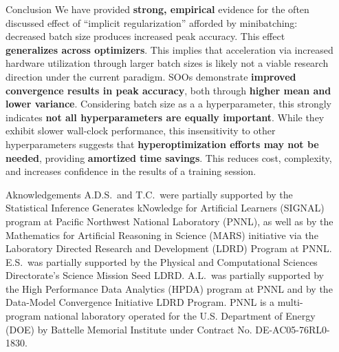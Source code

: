 \documentclass[final]{beamer}
\newlength{\sepwidth}
\newlength{\colwidth}
\newcommand{\separatorcolumn}{\begin{column}{\sepwidth}\end{column}}
\begin{document}
\begin{frame}[t]
\begin{columns}[t]
\begin{column}{\colwidth}
      \begin{block}{Conclusion}
        We have provided \textbf{strong, empirical} evidence for the often
        discussed effect of ``implicit regularization'' afforded by
        minibatching: decreased batch size produces increased peak accuracy.
        This effect \textbf{generalizes across optimizers}. This implies that
        acceleration via increased hardware utilization through larger batch
        sizes is likely not a viable research direction under the current
        paradigm. SOOs demonstrate \textbf{improved convergence results in peak
          accuracy}, both through \textbf{higher mean and lower variance}.
        Considering batch size as a a hyperparameter, this strongly indicates
        \textbf{not all hyperparameters are equally important}.  While they
        exhibit slower wall-clock performance, this insensitivity to other
        hyperparameters suggests that \textbf{hyperoptimization efforts may not
          be needed}, providing \textbf{amortized time savings}. This reduces cost,
        complexity, and increases confidence in the results of a training
        session.
      \end{block}

      \begin{block}{Aknowledgements}
        A.D.S.\ and T.C.\ were partially supported by the Statistical Inference
        Generates kNowledge for Artificial Learners (SIGNAL) program at Pacific
        Northwest National Laboratory (PNNL), as well as by the Mathematics for
        Artificial Reasoning in Science (MARS) initiative via the Laboratory
        Directed Research and Development (LDRD) Program at PNNL.  E.S.\ was
        partially supported by the Physical and Computational Sciences
        Directorate's Science Mission Seed LDRD. A.L.\ was partially supported
        by the High Performance Data Analytics (HPDA) program at PNNL and by the
        Data-Model Convergence Initiative LDRD Program. PNNL is a multi-program
        national laboratory operated for the U.S. Department of Energy (DOE) by
        Battelle Memorial Institute under Contract No. DE-AC05-76RL0-1830.
      \end{block}

    \end{column}

    \separatorcolumn
  \end{columns}
\end{frame}
\end{document}
